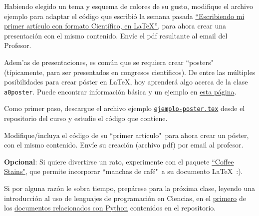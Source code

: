 \documentclass[11pt]{exam}
\begin{document}
\begin{questions}
\item Habiendo elegido un tema y esquema de colores de su gusto, modifique el archivo ejemplo para adaptar el código que escribió la semana pasada \href{https://github.com/gfrubi/CC/blob/master/guias/05/ejemplo-articulo.pdf}{``Escribiendo mi primer artículo con formato Científico, en \LaTeX''}, para ahora crear una presentación con el mismo contenido. Envíe el pdf resultante al email del Profesor. 

\item Adem'as de presentaciones, es común que se requiera crear ``posters"\, (típicamente, para ser presentados en congresos científicos). De entre las múltiples posibilidades para crear póster en \LaTeX, hoy aprenderá algo acerca de la clase \texttt{a0poster}. Puede encontrar información básica y un ejemplo en \href{https://www.latextemplates.com/template/a0poster-portrait-poster}{esta página}.

\item Como primer paso, descargue el archivo ejemplo \href{https://github.com/gfrubi/CC/blob/master/guias/06/ejemplo-poster.tex}{\texttt{ejemplo-poster.tex}} desde el repositorio del curso y estudie el código que contiene.

\item Modifique/incluya el código de su ``primer artículo"\, para ahora crear un póster, con el mismo contenido. Envíe su creación (archivo pdf) por email al profesor.

\item \textbf{Opcional}: Si quiere divertirse un rato, experimente con el paquete \href{http://hanno-rein.de/archives/349}{``Coffee Stains"}, que permite incorporar ``manchas de café"\, a su documento \LaTeX\ :). 

\item Si por alguna razón le sobra tiempo, prepárese para la próxima clase, leyendo una introducción al uso de lenguajes de programación en Ciencias, en el \href{https://github.com/gfrubi/CC/blob/master/Python/00-Computacion-Cientifica-con-Python.ipynb}{primero} de los \href{https://github.com/gfrubi/CC/tree/master/Python}{documentos relacionados con Python} contenidos en el repositorio.
\end{questions}
\end{document}
